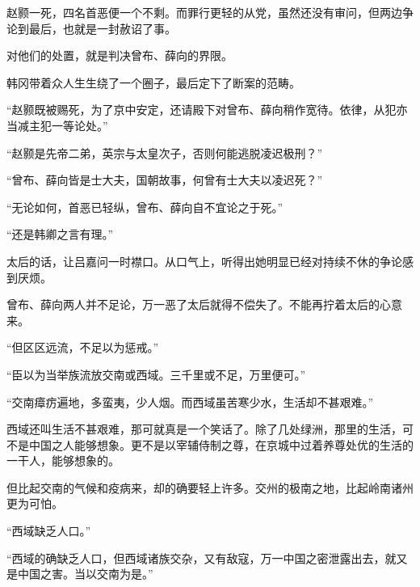 赵颢一死，四名首恶便一个不剩。而罪行更轻的从党，虽然还没有审问，但两边争论到最后，也就是一封赦诏了事。

对他们的处置，就是判决曾布、薛向的界限。

韩冈带着众人生生绕了一个圈子，最后定下了断案的范畴。

“赵颢既被赐死，为了京中安定，还请殿下对曾布、薛向稍作宽待。依律，从犯亦当减主犯一等论处。”

“赵颢是先帝二弟，英宗与太皇次子，否则何能逃脱凌迟极刑？”

“曾布、薛向皆是士大夫，国朝故事，何曾有士大夫以凌迟死？”

“无论如何，首恶已轻纵，曾布、薛向自不宜论之于死。”

“还是韩卿之言有理。”

太后的话，让吕嘉问一时襟口。从口气上，听得出她明显已经对持续不休的争论感到厌烦。

曾布、薛向两人并不足论，万一恶了太后就得不偿失了。不能再拧着太后的心意来。

“但区区远流，不足以为惩戒。”

“臣以为当举族流放交南或西域。三千里或不足，万里便可。”

“交南瘴疠遍地，多蛮夷，少人烟。而西域虽苦寒少水，生活却不甚艰难。”

西域还叫生活不甚艰难，那可就真是一个笑话了。除了几处绿洲，那里的生活，可不是中国之人能够想象。更不是以宰辅侍制之尊，在京城中过着养尊处优的生活的一干人，能够想象的。

但比起交南的气候和疫病来，却的确要轻上许多。交州的极南之地，比起岭南诸州更为可怕。

“西域缺乏人口。”

“西域的确缺乏人口，但西域诸族交杂，又有敌寇，万一中国之密泄露出去，就又是中国之害。当以交南为是。”

